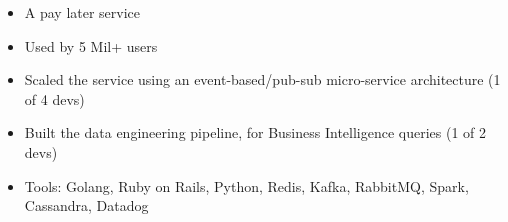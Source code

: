 \documentclass[11pt,a4paper,sans]{moderncv}
\begin{document}
{
    \begin{itemize}
    \item A pay later service
    \item Used by 5 Mil+ users
    \item Scaled the service using an event-based/pub-sub micro-service
    architecture (1 of 4 devs)
    \item Built the data engineering pipeline, for Business Intelligence queries
    (1 of 2 devs)
    \item Tools: Golang, Ruby on Rails, Python, Redis, Kafka, RabbitMQ, Spark,
    Cassandra, Datadog
    \end{itemize}
}

\end{document}

